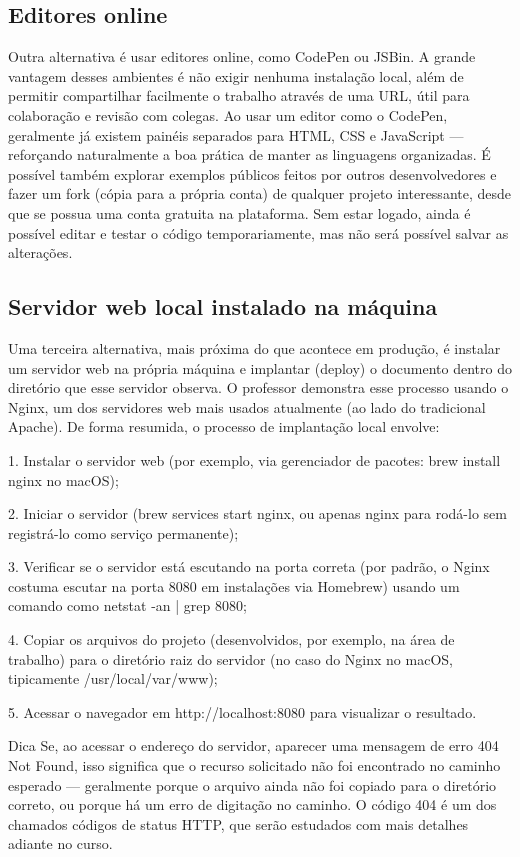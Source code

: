 \subsection{Editores online}

Outra alternativa é usar editores online, como CodePen ou JSBin. A grande vantagem desses ambientes é não exigir nenhuma instalação local, além de permitir compartilhar facilmente o trabalho através de uma URL, útil para colaboração e revisão com colegas. Ao usar um editor como o CodePen, geralmente já existem painéis separados para HTML, CSS e JavaScript — reforçando naturalmente a boa prática de manter as linguagens organizadas. É possível também explorar exemplos públicos feitos por outros desenvolvedores e fazer um fork (cópia para a própria conta) de qualquer projeto interessante, desde que se possua uma conta gratuita na plataforma. Sem estar logado, ainda é possível editar e testar o código temporariamente, mas não será possível salvar as alterações.

\subsection{Servidor web local instalado na máquina}

Uma terceira alternativa, mais próxima do que acontece em produção, é instalar um servidor web na própria máquina e implantar (deploy) o documento dentro do diretório que esse servidor observa. O professor demonstra esse processo usando o Nginx, um dos servidores web mais usados atualmente (ao lado do tradicional Apache). De forma resumida, o processo de implantação local envolve:

1. Instalar o servidor web (por exemplo, via gerenciador de pacotes: brew install nginx no macOS);

2. Iniciar o servidor (brew services start nginx, ou apenas nginx para rodá-lo sem registrá-lo como serviço permanente);

3. Verificar se o servidor está escutando na porta correta (por padrão, o Nginx costuma escutar na porta 8080 em instalações via Homebrew) usando um comando como netstat -an | grep 8080;

4. Copiar os arquivos do projeto (desenvolvidos, por exemplo, na área de trabalho) para o diretório raiz do servidor (no caso do Nginx no macOS, tipicamente /usr/local/var/www);

5. Acessar o navegador em http://localhost:8080 para visualizar o resultado.

\begin{infobox}{Dica}
Se, ao acessar o endereço do servidor, aparecer uma mensagem de erro 404 Not Found, isso significa que o recurso solicitado não foi encontrado no caminho esperado — geralmente porque o arquivo ainda não foi copiado para o diretório correto, ou porque há um erro de digitação no caminho. O código 404 é um dos chamados códigos de status HTTP, que serão estudados com mais detalhes adiante no curso.
\end{infobox}

